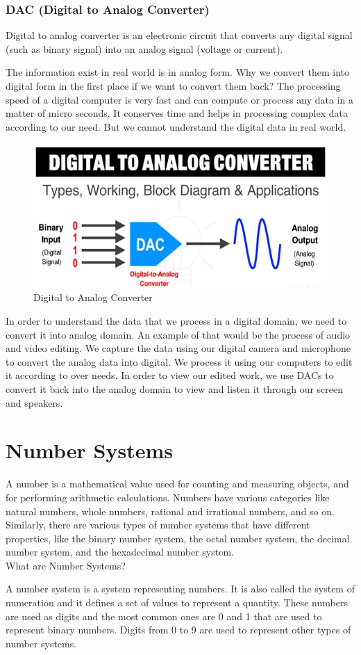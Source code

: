 \documentclass[11pt,a4paper,twoside]{article}
\begin{document}
\section{DAC (Digital to Analog Converter)}
Digital to analog converter is an electronic circuit that converts any digital signal (such as binary signal) into an analog signal (voltage or current).\par
The information exist in real world is in analog form. Why we convert them into digital form in the first place if we want to convert them back? The processing speed of a digital computer is very fast and can compute or process any data in a matter of micro seconds. It conserves time and helps in processing complex data according to our need. But we cannot understand the digital data in real world.
\begin{figure}[H]
\includegraphics[width=1\textwidth]{Fig 21.jpg}
\caption{Digital to Analog Converter}
\end{figure}
In order to understand the data that we process in a digital domain, we need to convert it into analog domain. An example of that would be the process of audio and video editing. We capture the data using our digital camera and microphone to convert the analog data into digital. We process it using our computers to edit it according to over needs. In order to view our edited work, we use DACs to convert it back into the analog domain to view and listen it through our screen and speakers.
\newpage
\part{Number Systems}
A number is a mathematical value used for counting and measuring objects, and for performing arithmetic calculations. Numbers have various categories like natural numbers, whole numbers, rational and irrational numbers, and so on. Similarly, there are various types of number systems that have different properties, like the binary number system, the octal number system, the decimal number system, and the hexadecimal number system.\\
What are Number Systems?\par
A number system is a system representing numbers. It is also called the system of numeration and it defines a set of values to represent a quantity. These numbers are used as digits and the most common ones are 0 and 1 that are used to represent binary numbers. Digits from 0 to 9 are used to represent other types of number systems.
\end{document}
